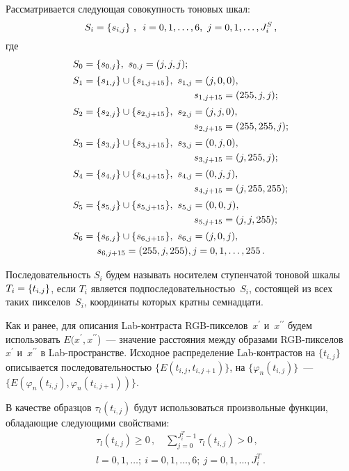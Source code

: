 \begin{multicols}{2}
  Рассматривается следующая совокупность тоновых шкал:
  $$
  S_i=\left\{ s_{i,j}\right\}\,,\enskip i=0,1, \ldots, 6, \ j=0,1,\ldots , J_i^S\,,
  $$
где 
\begin{align*}
S_0 &= \{s_{0,j}\},\ s_{0,j} = (j, j, j);\\[2pt]
S_1 &= \{s_{1,j}\}\cup \{s_{1,j+15}\},\ s_{1,j} = (j, 0, 0),\\
&\hspace*{40mm}s_{1,j+15} = (255, j, j);\\[2pt]
S_2 &= \{s_{2,j}\}\cup \{s_{2,j+15}\},\ s_{2,j} = (j, j, 0),\\
&\hspace*{40mm} s_{2,j+15} = (255, 255, j);\\[2pt] 
S_3 &= \{s_{3,j}\}\cup \{s_{3,j+15}\},\ s_{3,j} = (0, j, 0),\\
& \hspace*{40mm}s_{3,j+15} = (j, 255, j);\\[2pt]
S_4 &= \{s_{4,j}\}\cup \{s_{4,j+15}\},\ s_{4,j} = (0, j, j),\\
&\hspace*{40mm} s_{4,j+15} = (j, 255, 255);\\[2pt]
S_5 &= \{s_{5,j}\}\cup \{s_{5,j+15}\},\ s_{5,j} = (0, 0, j),\\
& \hspace*{40mm}s_{5,j+15} = (j, j, 255);\\[2pt]
S_6 &= \{s_{6,j}\}\cup \{s_{6,j+15}\},\ s_{6,j} = (j, 0, j),\\
& \hspace*{5mm}s_{6,j+15} = (255, j, 255), j = 0, 1, 
\ldots, 255\,.
\end{align*}
  
  Последовательность $S_i$ будем называть носителем ступенчатой тоновой 
шкалы $T_i\hm=\{t_{i,j}\}$, если $T_i$ является 
подпоследовательностью~$S_i$, состоящей из всех таких пикселов~$S_i$, 
координаты которых кратны семнадцати.
  
  Как и ранее, для описания Lab-конт\-рас\-та RGB-пик\-се\-лов~$x^\prime$ 
и~$x^{\prime\prime}$ будем использовать $E(x^\prime, x^{\prime\prime}$)~--- 
значение расстояния между образами RGB-пик\-селов~$x^\prime$ 
и~$x^{\prime\prime}$ в Lab-про\-стран\-стве.
    \mbox{Исходное} распределе\-ние Lab-конт\-рас\-тов на $\{t_{i,j}\}$ описывается 
последовательностью $\{E(t_{i,j},t_{i,j+1})\}$, на $\{\varphi_n(t_{i,j})\}$~--- 
$\{E(\varphi_n(t_{i,j}), \varphi_n(t_{i,j+1}))\}$.
  
  В качестве образцов $\tau_l(t_{i,j})$ будут использоваться произвольные 
функции, обладающие следующими свойствами:
  \begin{multline*}
\tau_l(t_{i,j})\geq 0\,,\quad \sum\limits_{j=0}^{J_i^T-1} \tau_l(t_{i,j})>0\,,\\
l=0,1,\ldots;\ i=0,1,\ldots, 6; \ j=0,1,\ldots , J_i^T\,.
\end{multline*}


\end{multicols}
